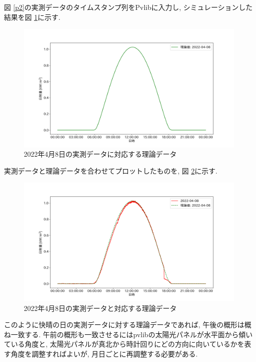 \documentclass[a4j,12pt,]{jarticle}
\begin{document}
図 \ref{p2}の実測データのタイムスタンプ列をPvlibに入力し, シミュレーションした結果を図 \ref{p3}に示す.

\begin{figure}[H]
  \begin{center}
    \includegraphics[width=160mm]{theoretical.png}
    \caption{2022年4月8日の実測データに対応する理論データ}
    \label{p3}
  \end{center}
\end{figure}

実測データと理論データを合わせてプロットしたものを, 図 \ref{p4}に示す.

\begin{figure}[H]
  \begin{center}
    \includegraphics[width=160mm]{real_and_theoretical.png}
    \caption{2022年4月8日の実測データと対応する理論データ}
    \label{p4}
  \end{center}
\end{figure}

このように快晴の日の実測データに対する理論データであれば, 午後の概形は概ね一致する. 午前の概形も一致させるにはpvlibの太陽光パネルが水平面から傾いている角度と, 太陽光パネルが真北から時計回りにどの方向に向いているかを表す角度を調整すればよいが, 月日ごとに再調整する必要がある.
\end{document}
